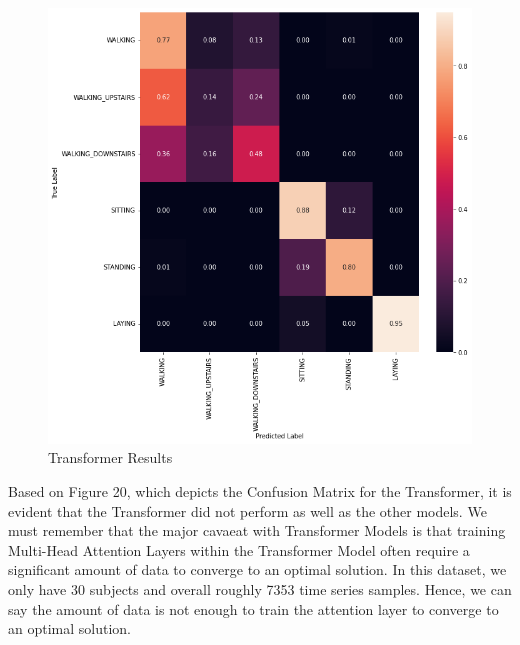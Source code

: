 \documentclass[conference]{IEEEtran}
\begin{document}
\begin{figure}
    \centering
    \includegraphics[width= 0.9 \linewidth]{transformer_results.png}
    \caption{Transformer Results}
    \label{transformer_results.png}
\end{figure}

Based on Figure 20, which depicts the Confusion Matrix for the Transformer, it is evident that the Transformer did not perform as well as the other models. We must remember that the major cavaeat with Transformer Models is that training Multi-Head Attention Layers within the Transformer Model often require a significant amount of data to converge to an optimal solution. In this dataset, we only have 30 subjects and overall roughly 7353 time series samples. Hence, we can say the amount of data is not enough to train the attention layer to converge to an optimal solution. 
\end{document}
